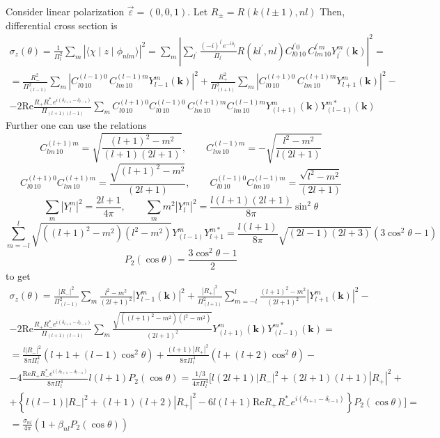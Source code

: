 \documentclass[a4paper,oneside,12pt]{extarticle}
\begin{document}
Consider linear polarization $\vec{\varepsilon}=(0,0,1)$. Let $R_{\pm}=R(k(l\pm 1),nl)$ Then, differential cross section is
\begin{multline}
\sigma_z (\theta) = \frac{1}{\Pi^2_{l}} \sum_m |\langle \chi \mid z \mid \phi_{nlm} \rangle|^2 =
\sum_m \left| \sum_{l^{\prime}} \frac{(-i)^{l^{\prime}}e^{-i\delta_{l^{\prime}}}}{\Pi_{l^{\prime}}} R(kl^{\prime},nl)
C_{l 0 \, 1 0}^{l^{\prime} 0}  \,
C_{l m \, 1 0}^{l^{\prime} m} Y_{l^{\prime}}^m (\mathbf{k}) \right|^2 = \\
= \frac{R_-^2}{\Pi^2_{(l-1)}} \sum_m \left| 
C_{l 0 \, 1 0}^{(l-1) 0}  \,
C_{l m \, 1 0}^{(l-1) m} Y_{l-1}^m (\mathbf{k}) \right|^2 +
\frac{R_+^2}{\Pi^2_{(l+1)}} \sum_m \left| 
C_{l 0 \, 1 0}^{(l+1) 0}  \,
C_{l m \, 1 0}^{(l+1) m} Y_{l+1}^m (\mathbf{k}) \right|^2 - \\
- 2 \mathrm{Re} \frac{R_+R_-^* e^{i(\delta_{l+1}-\delta_{l-1})} }{\Pi_{(l+1)(l-1)}} \sum_{m}
C_{l 0 \, 1 0}^{(l+1) 0} C_{l 0 \, 1 0}^{(l-1) 0}  \,
C_{l m \, 1 0}^{(l+1) m} C_{l m \, 1 0}^{(l-1) m}
Y_{(l+1)}^m (\mathbf{k}) Y_{(l-1)}^{m*} (\mathbf{k})
\end{multline}
%
Further one can use the relations
$$
C_{l m \, 1 0}^{(l+1) m} = \sqrt{\frac{(l+1)^2-m^2}{(l+1)(2l+1)}}, \qquad 
C_{l m \, 1 0}^{(l-1) m} = -\sqrt{\frac{l^2-m^2}{l(2l+1)}}
$$
$$
C_{l 0 \, 1 0}^{(l+1) 0} C_{l m \, 1 0}^{(l+1) m} = \frac{\sqrt{(l+1)^2-m^2}}{(2l+1)}, \qquad 
C_{l 0 \, 1 0}^{(l-1) 0} C_{l m \, 1 0}^{(l-1) m} = \frac{\sqrt{l^2-m^2}}{(2l+1)}
$$
$$
\sum_m |Y_l^m|^2 = \frac{2l+1}{4\pi}, \qquad 
\sum_m m^2 |Y_l^m|^2 = \frac{l(l+1)(2l+1)}{8\pi} \sin^2 \theta
$$
$$
\sum_{m=-l}^l \sqrt{((l+1)^2-m^2)(l^2-m^2)} Y_{(l-1)}^m Y_{l+1}^{m*} = \frac{l(l+1)}{8\pi}\sqrt{(2l-1)(2l+3)} (3\cos^2\theta - 1)
$$
$$
P_2(\cos\theta) = \frac{3\cos^2\theta - 1}{2}
$$
to get 
\begin{multline}
\sigma_z (\theta) = 
\frac{|R_-|^2}{\Pi^2_{(l-1)}} \sum_m \frac{l^2-m^2}{(2l+1)^2} \left| 
Y_{l-1}^m (\mathbf{k}) \right|^2 +
\frac{|R_+|^2}{\Pi^2_{(l+1)}} \sum_{m=-l}^l \frac{(l+1)^2-m^2}{(2l+1)^2} \left| 
Y_{l+1}^m (\mathbf{k}) \right|^2 - \\
- 2 \mathrm{Re} \frac{R_+R_-^* e^{i(\delta_{l+1}-\delta_{l-1})} }{\Pi_{(l+1)(l-1)}} \sum_{m}
\frac{\sqrt{((l+1)^2-m^2)(l^2-m^2)}}{(2l+1)^2}
Y_{(l+1)}^m (\mathbf{k}) Y_{(l-1)}^{m*} (\mathbf{k}) =\\
%
= \frac{l |R_-|^2}{8\pi \Pi^4_{l}} (l+1+(l-1)\cos^2\theta) +
\frac{(l+1) |R_+|^2}{8\pi \Pi^4_{l}} (l+(l+2)\cos^2\theta) -\\
-4 \frac{\mathrm{Re} R_+R_-^* e^{i(\delta_{l+1}-\delta_{l-1})} }{8\pi\Pi^4_{l}} l(l+1)P_2(\cos\theta)
= \frac{1/3}{4\pi \Pi^4_{l}} [ l(2l+1)|R_-|^2  + (2l+1)(l+1)|R_+|^2 +\\
+ \left\{ l(l-1)|R_-|^2 + (l+1)(l+2)|R_+|^2 - 6l(l+1) \mathrm{Re}{R_+R_-^* e^{i(\delta_{l+1}-\delta_{l-1})} } \right\} P_2(\cos\theta)] =\\
= \frac{\sigma_{nl}}{4\pi}(1+\beta_{nl} P_2(\cos\theta))
\end{multline}
\end{document}
